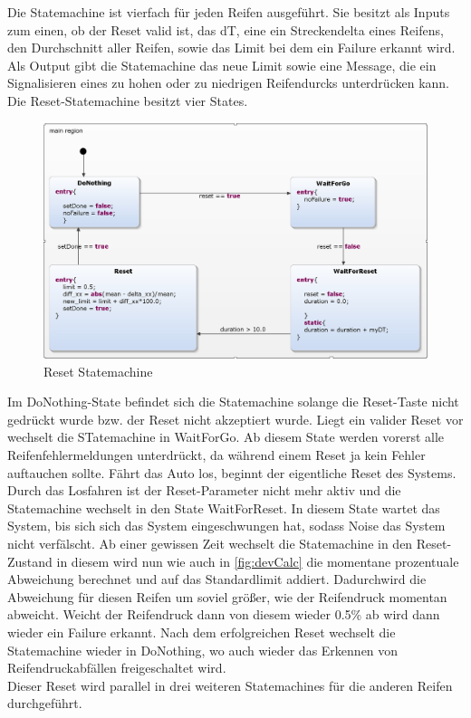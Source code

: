 Die Statemachine ist vierfach für jeden Reifen ausgeführt. Sie besitzt als Inputs zum einen, ob der Reset valid ist, das dT, eine ein Streckendelta eines Reifens, den Durchschnitt aller Reifen, sowie das Limit bei dem ein Failure erkannt wird. Als Output gibt die Statemachine das neue Limit sowie eine Message, die ein Signalisieren eines zu hohen oder zu niedrigen Reifendurcks unterdrücken kann.\\
Die Reset-Statemachine besitzt vier States.
\begin{figure}[H]
	\centering
	\includegraphics[width=1\linewidth]{../Graphiken/ResetStateMachine.png}
	\caption{Reset Statemachine}
	\label{fig:ResetStateMachine}
\end{figure}
Im DoNothing-State befindet sich die Statemachine solange die Reset-Taste nicht gedrückt wurde bzw. der Reset nicht akzeptiert wurde. Liegt ein valider Reset vor wechselt die STatemachine in WaitForGo. Ab diesem State werden vorerst alle Reifenfehlermeldungen unterdrückt, da während einem Reset ja kein Fehler auftauchen sollte. Fährt das Auto los, beginnt der eigentliche Reset des Systems. Durch das Losfahren ist der Reset-Parameter nicht mehr aktiv und die Statemachine wechselt in den State WaitForReset. In diesem State wartet das System, bis sich sich das System eingeschwungen hat, sodass Noise das System nicht verfälscht. Ab einer gewissen Zeit wechselt die Statemachine in den Reset-Zustand in diesem wird nun wie auch in \autoref{fig:devCalc} die momentane prozentuale Abweichung berechnet und auf das Standardlimit addiert. Dadurchwird die Abweichung für diesen Reifen um soviel größer, wie der Reifendruck momentan abweicht. Weicht der Reifendruck dann von diesem wieder 0.5\% ab wird dann wieder ein Failure erkannt. Nach dem erfolgreichen Reset wechselt die Statemachine wieder in DoNothing, wo auch wieder das Erkennen von Reifendruckabfällen freigeschaltet wird.\\
Dieser Reset wird parallel in drei weiteren Statemachines für die anderen Reifen durchgeführt.\\

